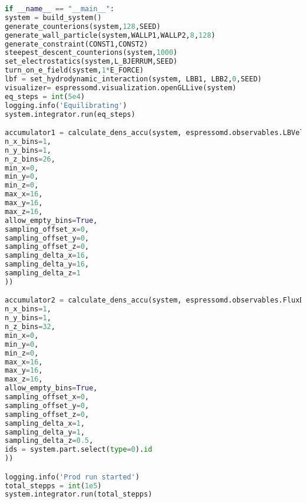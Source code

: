 \begin{lstlisting}[language=python]
if __name__ == "__main__":
system = build_system()
generate_counterions(system,128,SEED)
generate_wall_particle(system,WALLP1,WALLP2,8,128)
generate_constraint(CONST1,CONST2)
steepest_descent_counterions(system,1000)
set_electrostatics(system,L_BJERRUM,SEED)
turn_on_e_field(system,1*E_FORCE)
lbf = set_hydrodynamic_interaction(system, LBB1, LBB2,0,SEED)
visualizer= espressomd.visualization.openGLLive(system)
eq_steps = int(5e4)
logging.info('Equilibrating')
system.integrator.run(eq_steps)

accumulator1 = calculate_dens_accu(system, espressomd.observables.LBVelocityProfile(
n_x_bins=1,
n_y_bins=1,
n_z_bins=26,
min_x=0,
min_y=0,
min_z=0,
max_x=16,
max_y=16,
max_z=16, 
allow_empty_bins=True,
sampling_offset_x=0,
sampling_offset_y=0,
sampling_offset_z=0,
sampling_delta_x=16,
sampling_delta_y=16,
sampling_delta_z=1
))

accumulator2 = calculate_dens_accu(system, espressomd.observables.FluxDensityProfile(
n_x_bins=1,
n_y_bins=1,
n_z_bins=32,
min_x=0,
min_y=0,
min_z=0,
max_x=16,
max_y=16,
max_z=16,
allow_empty_bins=True,
sampling_offset_x=0,
sampling_offset_y=0,
sampling_offset_z=0,
sampling_delta_x=1,
sampling_delta_y=1,
sampling_delta_z=0.5,
ids = system.part.select(type=0).id
))

logging.info('Prod run started')
total_stepps = int(1e5)
system.integrator.run(total_stepps)
\end{lstlisting}

\begin{lstlisting}[language=python]
	
\end{lstlisting}